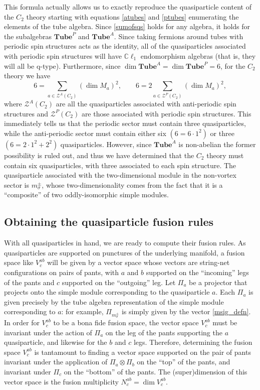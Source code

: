 \documentclass[12pt,a4paper]{article}
\newcommand{\tp}{\otimes}
\newcommand{\mcz}{\mathcal{Z}}
\newcommand\be            {\begin{equation}}
\newcommand\ee            {\end{equation}}
\newcommand{\cl}{\mathbb{C}\ell}
\newcommand{\tube}{\textbf{Tube}}
\begin{document}
This formula actually allows us to exactly reproduce the quasiparticle content of the $C_2$ theory starting with equations \eqref{atubes} and \eqref{ptubes} enumerating the elements of the tube algebra. Since \eqref{sumofsqs} holds for any algebra, it holds for the subalgebras $\tube^P$ and $\tube^A$. Since taking fermions around tubes with periodic spin structures acts as the identity,%
all of the quasiparticles associated with periodic spin structures will have $\cl_1$ endomorphism algebras (that is, they will all be q-type). Furthermore, since $\dim \tube^A = \dim \tube^P = 6$, for the $C_2$ theory we have 
\be 6 = \sum_{a \in \mcz^A(C_2)} (\dim M_a)^2,\qquad 6 = 2 \sum_{a\in \mcz^P(C_2)} (\dim M_a)^2,\ee
where $\mcz^A(C_2)$ are all the quasiparticles associated with anti-periodic spin structures and $\mcz^P(C_2)$ are those associated with periodic spin structures. This immediately tells us that the periodic sector must contain three quasiparticles, while the anti-periodic sector must contain either six $(6 = 6\cdot 1^2)$ or three $(6=2\cdot 1^2 + 2^2)$ quasiparticles. However, since $\tube^A$ is non-abelian the former possibility is ruled out, and thus we have determined that the $C_2$ theory must contain six quasiparticles, with three associated to each spin structure. The quasiparticle associated with the two-dimensional module in the non-vortex sector is $m_\sigma^\pm$, whose two-dimensionality comes from the fact that it is a ``composite'' of two oddly-isomorphic simple modules. 


\subsection{Obtaining the quasiparticle fusion rules} \label{fusion}

With all quasiparticles in hand, we are ready to compute their fusion rules. As quasiparticles are supported on punctures of the underlying manifold, a fusion space like $V^{ab}_c$ will be given by a vector space whose vectors are string-net configurations on pairs of pants, with $a$ and $b$ supported on the ``incoming'' legs of the pants and $c$ supported on the ``outgoing'' leg. Let $\Pi_a$ be a projector that projects onto the simple module corresponding to the quasiparticle $a$. Each $\Pi_a$ is given precisely by the tube algebra representation of the simple module corresponding to $a$: for example, $\Pi_{m_\sigma^\pm}$ is simply given by the vector \eqref{msig_defn}. In order for $V^{ab}_c$ to be a bona fide fusion space, the vector space $V^{ab}_c$ must be invariant under the action of $\Pi_a$ on the leg of the pants supporting the $a$ quasiparticle, and likewise for the $b$ and $c$ legs. Therefore, determining the fusion space $V^{ab}_c$ is tantamount to finding a vector space supported on the pair of pants invariant under the application of $\Pi_a\tp \Pi_b$ on the ``top'' of the pants, and invariant under $\Pi_c$ on the ``bottom'' of the pants. The (super)dimension of this vector space is the fusion multiplicity $N^{ab}_c = \dim V^{ab}_c$. 
\end{document}
